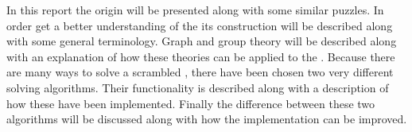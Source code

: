 In this report the origin \rubik{} will be presented along with some similar puzzles. 
In order get a better understanding of the \rubik{} its construction will be described along with some general terminology. 
Graph and group theory will be described along with an explanation of how these theories can be applied to the \rubik{}.
Because there are many ways to solve a scrambled \rubik{}, there have been chosen two very different solving algorithms.
Their functionality is described along with a description of how these have been implemented.
Finally the difference between these two algorithms will be discussed along with how the implementation can be improved.